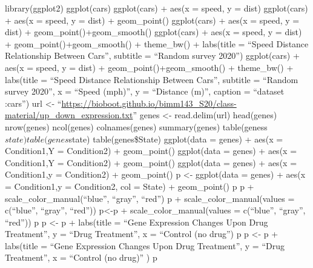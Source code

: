 \documentclass[
]{article}
\author{}
\date{\vspace{-2.5em}}
\begin{document}
library(ggplot2) ggplot(cars) ggplot(cars) + aes(x = speed, y = dist)
ggplot(cars) + aes(x = speed, y = dist) + geom\_point() ggplot(cars) +
aes(x = speed, y = dist) + geom\_point()+geom\_smooth() ggplot(cars) +
aes(x = speed, y = dist) + geom\_point()+geom\_smooth() + theme\_bw() +
labs(title = ``Speed Distance Relationship Between Cars'', subtitle =
``Random survey 2020'') ggplot(cars) + aes(x = speed, y = dist) +
geom\_point()+geom\_smooth() + theme\_bw() + labs(title = ``Speed
Distance Relationship Between Cars'', subtitle = ``Random survey 2020'',
x = ``Speed (mph)'', y = ``Distance (m)'', caption = ``dataset :cars'')
url \textless-
``\url{https://bioboot.github.io/bimm143_S20/class-material/up_down_expression.txt}''
genes \textless- read.delim(url) head(genes) nrow(genes) ncol(genes)
colnames(genes) summary(genes) table(geness\(state) table(genes\)state)
table(genes\$State) ggplot(data = genes) + aes(x = Condition1,Y =
Condition2) + geom\_point() ggplot(data = genes) + aes(x = Condition1,Y
= Condition2) + geom\_point() ggplot(data = genes) + aes(x =
Condition1,y = Condition2) + geom\_point() p \textless- ggplot(data =
genes) + aes(x = Condition1,y = Condition2, col = State) + geom\_point()
p p + scale\_color\_manual(``blue'', ``gray'', ``red'') p +
scale\_color\_manual(values = c(``blue'', ``gray'', ``red''))
p\textless-p + scale\_color\_manual(values = c(``blue'', ``gray'',
``red'')) p p \textless- p + labs(title = ``Gene Expression Changes Upon
Drug Treatment'', y = ``Drug Treatment'', x = ``Control (no drug'') p p
\textless- p + labs(title = ``Gene Expression Changes Upon Drug
Treatment'', y = ``Drug Treatment'', x = ``Control (no drug)'' ) p
\end{document}
